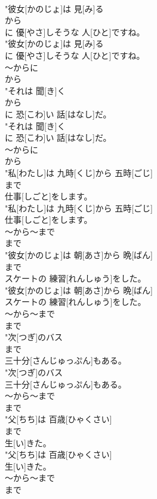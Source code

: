 \documentclass[8pt]{extreport}
\begin{document}
\begin{CJK}{UTF8}{min}
\\	"彼女[かのじょ]は 見[み]る
\\	から
\\	に 優[やさ]しそうな 人[ひと]ですね。
\\	"彼女[かのじょ]は 見[み]る
\\	に 優[やさ]しそうな 人[ひと]ですね。
\\	～からに	
\\	から
\\	"それは 聞[き]く
\\	から
\\	に 恐[こわ]い 話[はなし]だ。
\\	"それは 聞[き]く
\\	に 恐[こわ]い 話[はなし]だ。
\\	～からに	
\\	から
\\	"私[わたし]は 九時[くじ]から 五時[ごじ]
\\	まで
\\	仕事[しごと]をします。
\\	"私[わたし]は 九時[くじ]から 五時[ごじ]
\\	仕事[しごと]をします。
\\	～から～まで	
\\	まで
\\	"彼女[かのじょ]は 朝[あさ]から 晩[ばん]
\\	まで
\\	スケートの 練習[れんしゅう]をした。
\\	"彼女[かのじょ]は 朝[あさ]から 晩[ばん]
\\	スケートの 練習[れんしゅう]をした。
\\	～から～まで	
\\	まで
\\	"次[つぎ]のバス
\\	まで
\\	三十分[さんじゅっぷん]もある。
\\	"次[つぎ]のバス
\\	三十分[さんじゅっぷん]もある。
\\	～から～まで	
\\	まで
\\	"父[ちち]は 百歳[ひゃくさい]
\\	まで
\\	生[い]きた。
\\	"父[ちち]は 百歳[ひゃくさい]
\\	生[い]きた。
\\	～から～まで	
\\	まで

\end{CJK}
\end{document}
